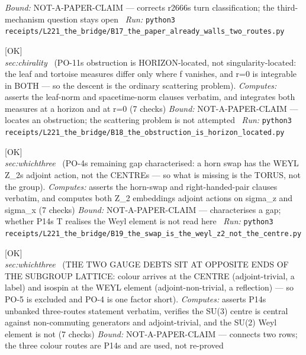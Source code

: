 \begin{description}
 \emph{Bound:} NOT-A-PAPER-CLAIM --- corrects r2666s turn classification; the third-mechanism question stays open
\ \emph{Run:} \texttt{python3 receipts/L221\_the\_bridge/B17\_the\_paper\_already\_walls\_two\_routes.py}
\item[\label{rcpt:B18_the_obstruction_is_horizon_located}\textbf{}\quad\texttt{B18\_the\_obstruction\_is\_horizon\_located}]\hfill\textsf{[OK]}\\
\textit{sec:chirality} \ (PO-11s obstruction is HORIZON-located, not singularity-located: the leaf and tortoise measures differ only where f vanishes, and r=0 is integrable in BOTH --- so the descent is the ordinary scattering problem). 
\emph{Computes:} asserts the leaf-norm and spacetime-norm clauses verbatim, and integrates both measures at a horizon and at r=0 (7 checks)
 \emph{Bound:} NOT-A-PAPER-CLAIM --- locates an obstruction; the scattering problem is not attempted
\ \emph{Run:} \texttt{python3 receipts/L221\_the\_bridge/B18\_the\_obstruction\_is\_horizon\_located.py}
\item[\label{rcpt:B19_the_swap_is_the_weyl_z2_not_the_centre}\textbf{}\quad\texttt{B19\_the\_swap\_is\_the\_weyl\_z2\_not\_the\_centre}]\hfill\textsf{[OK]}\\
\textit{sec:whichthree} \ (PO-4s remaining gap characterised: a horn swap has the WEYL Z\_2s adjoint action, not the CENTREs --- so what is missing is the TORUS, not the group). 
\emph{Computes:} asserts the horn-swap and right-handed-pair clauses verbatim, and computes both Z\_2 embeddings adjoint actions on sigma\_z and sigma\_x (7 checks)
 \emph{Bound:} NOT-A-PAPER-CLAIM --- characterises a gap; whether P14s T realises the Weyl element is not read here
\ \emph{Run:} \texttt{python3 receipts/L221\_the\_bridge/B19\_the\_swap\_is\_the\_weyl\_z2\_not\_the\_centre.py}
\item[\label{rcpt:B20_centre_and_weyl_are_opposite_ends}\textbf{}\quad\texttt{B20\_centre\_and\_weyl\_are\_opposite\_ends}]\hfill\textsf{[OK]}\\
\textit{sec:whichthree} \ (THE TWO GAUGE DEBTS SIT AT OPPOSITE ENDS OF THE SUBGROUP LATTICE: colour arrives at the CENTRE (adjoint-trivial, a label) and isospin at the WEYL element (adjoint-non-trivial, a reflection) --- so PO-5 is excluded and PO-4 is one factor short). 
\emph{Computes:} asserts P14s unbanked three-routes statement verbatim, verifies the SU(3) centre is central against non-commuting generators and adjoint-trivial, and the SU(2) Weyl element is not (7 checks)
 \emph{Bound:} NOT-A-PAPER-CLAIM --- connects two rows; the three colour routes are P14s and are used, not re-proved

\end{description}
